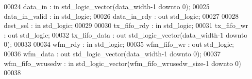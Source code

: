 \begin{DoxyCode}
00024           \textcolor{vhdlchar}{data_in}               \textcolor{vhdlchar}{:} \textcolor{keywordflow}{in} \textcolor{comment}{std\_logic\_vector}\textcolor{vhdlchar}{(}\textcolor{vhdlchar}{data_width}\textcolor{vhdlchar}{-}\textcolor{vhdllogic}{}\textcolor{vhdllogic}{1} \textcolor{keywordflow}{downto} \textcolor{vhdllogic}{}\textcolor{vhdllogic}{0}\textcolor{vhdlchar}{)};
00025           \textcolor{vhdlchar}{data_in_valid}     \textcolor{vhdlchar}{:} \textcolor{keywordflow}{in} \textcolor{comment}{std\_logic};
00026           \textcolor{vhdlchar}{data_in_rdy}           \textcolor{vhdlchar}{:} \textcolor{keywordflow}{out} \textcolor{comment}{std\_logic};
00027           
00028           \textcolor{vhdlchar}{dest_sel}              \textcolor{vhdlchar}{:} \textcolor{keywordflow}{in} \textcolor{comment}{std\_logic};
00029           
00030           \textcolor{vhdlchar}{tx_fifo_rdy}           \textcolor{vhdlchar}{:} \textcolor{keywordflow}{in} \textcolor{comment}{std\_logic};
00031           \textcolor{vhdlchar}{tx_fifo_wr}            \textcolor{vhdlchar}{:} \textcolor{keywordflow}{out} \textcolor{comment}{std\_logic};
00032           \textcolor{vhdlchar}{tx_fifo_data}          \textcolor{vhdlchar}{:} \textcolor{keywordflow}{out} \textcolor{comment}{std\_logic\_vector}\textcolor{vhdlchar}{(}\textcolor{vhdlchar}{data_width}\textcolor{vhdlchar}{-}\textcolor{vhdllogic}{}\textcolor{vhdllogic}{1} \textcolor{keywordflow}{downto} \textcolor{vhdllogic}{}\textcolor{vhdllogic}{0}\textcolor{vhdlchar}{)};
00033           
00034           \textcolor{vhdlchar}{wfm_rdy}               \textcolor{vhdlchar}{:} \textcolor{keywordflow}{in} \textcolor{comment}{std\_logic};
00035           \textcolor{vhdlchar}{wfm_fifo_wr}           \textcolor{vhdlchar}{:} \textcolor{keywordflow}{out} \textcolor{comment}{std\_logic};
00036           \textcolor{vhdlchar}{wfm_data}              \textcolor{vhdlchar}{:} \textcolor{keywordflow}{out} \textcolor{comment}{std\_logic\_vector}\textcolor{vhdlchar}{(}\textcolor{vhdlchar}{data_width}\textcolor{vhdlchar}{-}\textcolor{vhdllogic}{}\textcolor{vhdllogic}{1} \textcolor{keywordflow}{downto} \textcolor{vhdllogic}{}\textcolor{vhdllogic}{0}\textcolor{vhdlchar}{)};
00037           \textcolor{vhdlchar}{wfm_fifo_wrusedw}  \textcolor{vhdlchar}{:} \textcolor{keywordflow}{in} \textcolor{comment}{std\_logic\_vector}\textcolor{vhdlchar}{(}\textcolor{vhdlchar}{wfm_fifo_wrusedw_size}\textcolor{vhdlchar}{-}\textcolor{vhdllogic}{}\textcolor{vhdllogic}{1} \textcolor{keywordflow}{downto} \textcolor{vhdllogic}{}\textcolor{vhdllogic}{0}\textcolor{vhdlchar}{)}
00038           

\end{DoxyCode}

